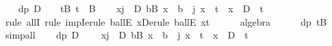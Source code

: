\begin{isabellebody}
\isamarkupfalse%
\isanewline
\ \ \isamarkupfalse%
\ dp{\isacharcolon}{\kern0pt}\ {\isachardoublequoteopen}D\ {\isachargreater}{\kern0pt}\ {}{\isachardoublequoteclose}\ \ tB{\isacharcolon}{\kern0pt}\ {\isachardoublequoteopen}t\ {\isasymin}\ B{\isachardoublequoteclose}\isanewline
\ \ \isamarkupfalse%
\ {\isachardoublequoteopen}{\isacharparenleft}{\kern0pt}{\isasymforall}x{\isachardot}{\kern0pt}{\isacharparenleft}{\kern0pt}{\isasymforall}j{\isasymin}{\isacharbraceleft}{\kern0pt}{}\ {\isachardot}{\kern0pt}{\isachardot}{\kern0pt}\ D{\isacharbraceright}{\kern0pt}{\isachardot}{\kern0pt}\ {\isasymforall}b{\isasymin}B{\isachardot}{\kern0pt}\ x\ {\isasymnoteq}\ b\ {\isacharplus}{\kern0pt}\ j{\isacharparenright}{\kern0pt}{\isasymlongrightarrow}\ {\isacharparenleft}{\kern0pt}x\ {\isasymnoteq}\ t{\isacharparenright}{\kern0pt}\ {\isasymlongrightarrow}\ {\isacharparenleft}{\kern0pt}x\ {\isacharminus}{\kern0pt}\ D\ {\isasymnoteq}\ t{\isacharparenright}{\kern0pt}{\isacharparenright}{\kern0pt}{\isachardoublequoteclose}\ \isanewline
\ \ \ \ \isamarkupfalse%
\ {\isacharparenleft}{\kern0pt}rule\ allI{\isacharcomma}{\kern0pt}\ rule\ impI{\isacharcomma}{\kern0pt}erule\ ballE{\isacharbrackleft}{\kern0pt}\ x{\isacharequal}{\kern0pt}{\isachardoublequoteopen}D{\isachardoublequoteclose}{\isacharbrackright}{\kern0pt}{\isacharcomma}{\kern0pt}erule\ ballE{\isacharbrackleft}{\kern0pt}\ x{\isacharequal}{\kern0pt}{\isachardoublequoteopen}t{\isachardoublequoteclose}{\isacharbrackright}{\kern0pt}{\isacharparenright}{\kern0pt}\isanewline
\ \ \ \ \isamarkupfalse%
\ algebra\isanewline
\ \ \ \ \isamarkupfalse%
\ dp\ tB\ \isamarkupfalse%
\ simp{\isacharunderscore}{\kern0pt}all\isanewline
{}\isamarkupfalse%
\isanewline
\ \ \isamarkupfalse%
\ dp{\isacharcolon}{\kern0pt}\ {\isachardoublequoteopen}D\ {\isachargreater}{\kern0pt}\ {}{\isachardoublequoteclose}\ \isamarkupfalse%
\ {\isachardoublequoteopen}{\isacharparenleft}{\kern0pt}{\isasymforall}x{\isachardot}{\kern0pt}{\isacharparenleft}{\kern0pt}{\isasymforall}j{\isasymin}{\isacharbraceleft}{\kern0pt}{}\ {\isachardot}{\kern0pt}{\isachardot}{\kern0pt}\ D{\isacharbraceright}{\kern0pt}{\isachardot}{\kern0pt}\ {\isasymforall}b{\isasymin}B{\isachardot}{\kern0pt}\ x\ {\isasymnoteq}\ b\ {\isacharplus}{\kern0pt}\ j{\isacharparenright}{\kern0pt}{\isasymlongrightarrow}\ {\isacharparenleft}{\kern0pt}x\ {\isacharless}{\kern0pt}\ t{\isacharparenright}{\kern0pt}\ {\isasymlongrightarrow}\ {\isacharparenleft}{\kern0pt}x\ {\isacharminus}{\kern0pt}\ D\ {\isacharless}{\kern0pt}\ t{\isacharparenright}{\kern0pt}{\isacharparenright}{\kern0pt}{\isachardoublequoteclose}\ \isamarkupfalse%

\end{isabellebody}
